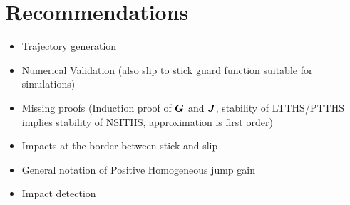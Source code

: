 \documentclass[../DC2017114Bouma.tex]{subfiles}
\begin{document}
\section{Recommendations}
\begin{itemize}
\item Trajectory generation
\item Numerical Validation (also slip to stick guard function suitable for simulations)
\item Missing proofs (Induction proof of ${\boldsymbol{G}}$ and ${\boldsymbol{J}}$, stability of LTTHS/PTTHS implies stability of NSITHS, approximation is first order)
\item Impacts at the border between stick and slip
\item General notation of Positive Homogeneous jump gain
\item Impact detection
\end{itemize}
\end{document}
